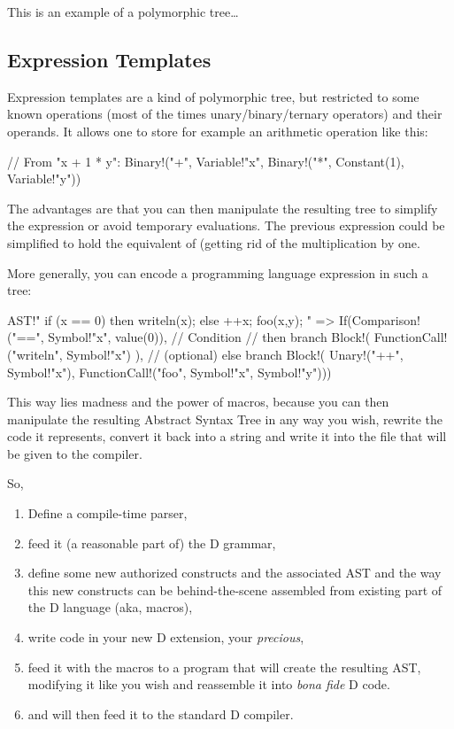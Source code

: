 This is an example of a polymorphic tree\ldots

\subsection{Expression Templates}\label{expressiontemplates}

Expression templates are a kind of polymorphic tree, but restricted to some known operations (most of the times unary/binary/ternary operators) and their operands. It allows one to store for example an arithmetic operation like this:

\begin{dcode}
// From "x + 1 * y":
Binary!("+", 
             Variable!"x",
             Binary!("*", 
                         Constant(1),
                         Variable!"y"))
\end{dcode}

The advantages are that you can then manipulate the resulting tree to simplify the expression or avoid temporary evaluations. The previous expression could be simplified to hold the equivalent of  (getting rid of the multiplication by one.

More generally, you can encode a programming language expression in such a tree:

\begin{dcode}
AST!"
if (x == 0) 
then 
{ 
    writeln(x);
} 
else 
{ 
    ++x;
    foo(x,y);
}"
=>
If(Comparison!("==", Symbol!"x", value(0)), // Condition
// then branch
   Block!( FunctionCall!("writeln", Symbol!"x") ),
// (optional) else branch
   Block!( Unary!("++", Symbol!"x"),
           FunctionCall!("foo", Symbol!"x", Symbol!"y")))
\end{dcode}

This way lies madness and the power of macros, because you can then manipulate the resulting Abstract Syntax Tree in any way you wish, rewrite the code it represents, convert it back into a string and write it into the file that will be given to the compiler. 

So,

\begin{enumerate}
\item Define a compile-time parser,
\item feed it (a reasonable part of) the D grammar,
\item define some new authorized constructs and the associated AST and the way this new constructs can be behind-the-scene assembled from existing part of the D language (aka, macros),
\item write code in your new D extension, your \emph{precious},
\item feed it with the macros to a program that will create the resulting AST, modifying it like you wish and reassemble it into \emph{bona fide} D code.
\item and will then feed it to the standard D compiler.
\end{enumerate}

